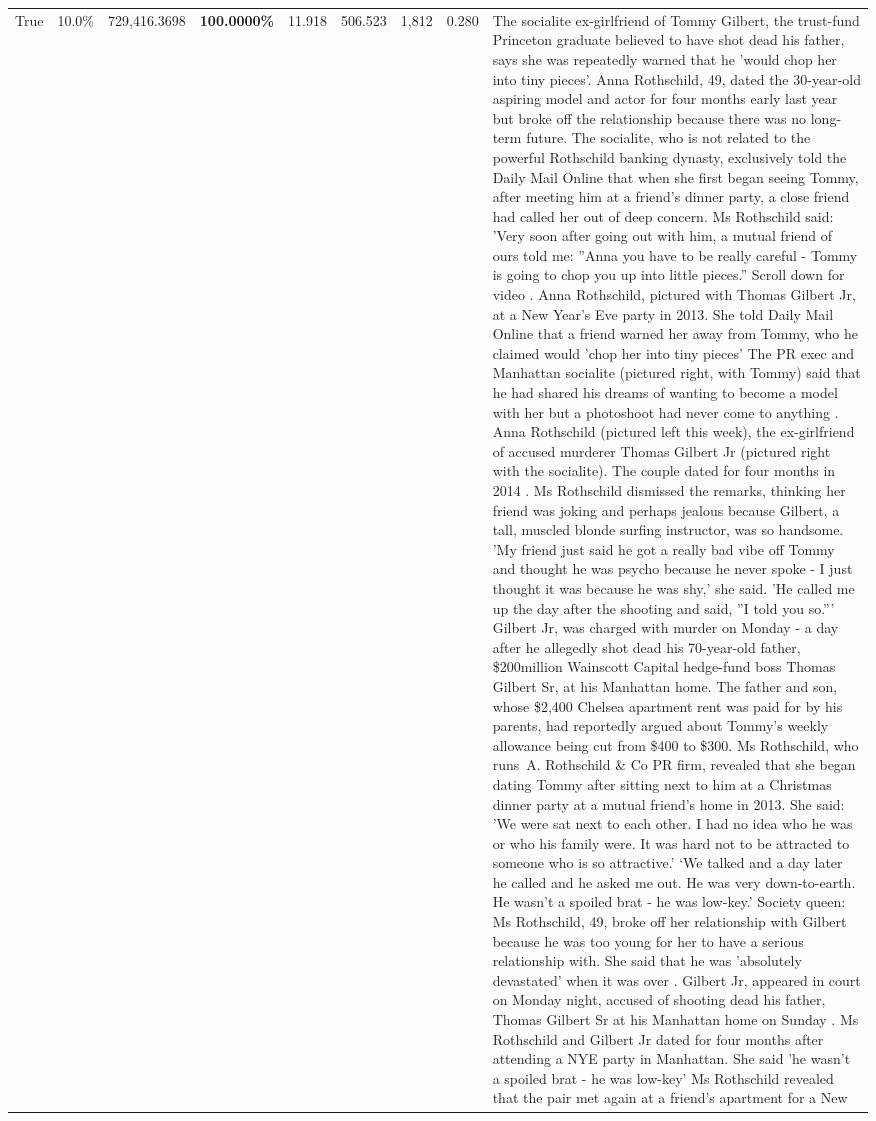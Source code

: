 \begin{table}[H]
\begin{tabular}{lllrlllll}
True & 10.0\% & 729,416.3698 & \bfseries \color{red} 100.0000\% & 11.918 & 506.523 & 1,812 & 0.280 & The socialite ex-girlfriend of Tommy Gilbert, the trust-fund Princeton graduate believed to have shot dead his father, says she was repeatedly warned that he 'would chop her into tiny pieces'. Anna Rothschild, 49, dated the 30-year-old aspiring model and actor for four months early last year but broke off the relationship because there was no long-term future. The socialite, who is not related to the powerful Rothschild banking dynasty, exclusively told the Daily Mail Online that when she first began seeing Tommy, after meeting him at a friend's dinner party, a close friend had called her out of deep concern. Ms Rothschild said: 'Very soon after going out with him, a mutual friend of ours told me: ''Anna you have to be really careful - Tommy is going to chop you up into little pieces.'' Scroll down for video . Anna Rothschild, pictured with Thomas Gilbert Jr, at a New Year's Eve party in 2013. She told Daily Mail Online that a friend warned her away from Tommy, who he claimed would 'chop her into tiny pieces' The PR exec and Manhattan socialite (pictured right, with Tommy) said that he had shared his dreams of wanting to become a model with her but a photoshoot had never come to anything . Anna Rothschild (pictured left this week), the ex-girlfriend of accused murderer Thomas Gilbert Jr (pictured right with the socialite). The couple dated for four months in 2014 . Ms Rothschild dismissed the remarks, thinking her friend was joking and perhaps jealous because Gilbert, a tall, muscled blonde surfing instructor, was so handsome. 'My friend just said he got a really bad vibe off Tommy and thought he was psycho because he never spoke - I just thought it was because he was shy,' she said. 'He called me up the day after the shooting and said, ''I told you so.''' Gilbert Jr, was charged with murder on Monday - a day after he allegedly shot dead his 70-year-old father, \$200million Wainscott Capital hedge-fund boss Thomas Gilbert Sr, at his Manhattan home. The father and son, whose \$2,400 Chelsea apartment rent was paid for by his parents, had reportedly argued about Tommy's weekly allowance being cut from \$400 to \$300. Ms Rothschild, who runs A. Rothschild \& Co PR firm, revealed that she began dating Tommy after sitting next to him at a Christmas dinner party at a mutual friend's home in 2013. She said: 'We were sat next to each other. I had no idea who he was or who his family were. It was hard not to be attracted to someone who is so attractive.' ‘We talked and a day later he called and he asked me out. He was very down-to-earth. He wasn’t a spoiled brat - he was low-key.’ Society queen: Ms Rothschild, 49, broke off her relationship with Gilbert because he was too young for her to have a serious relationship with. She said that he was 'absolutely devastated' when it was over . Gilbert Jr, appeared in court on Monday night, accused of shooting dead his father, Thomas Gilbert Sr at his Manhattan home on Sunday . Ms Rothschild and Gilbert Jr dated for four months after attending a NYE party in Manhattan. She said 'he wasn't a spoiled brat - he was low-key' Ms Rothschild revealed that the pair met again at a friend’s apartment for a New 
\end{tabular}
\end{table}
